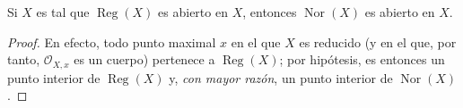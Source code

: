 \begin{corollary}[6.13.5]
\label{IV.2.s6.13.5-fr}
Si $X$ es tal que $\operatorname{Reg}(X)$ es abierto en $X$, entonces
$\operatorname{Nor}(X)$ es abierto en $X$.
\end{corollary}

\begin{proof}
En efecto, todo punto maximal $x$ en el que $X$ es reducido (y en el
que, por tanto, $\mathcal O_{X,x}$ es un cuerpo) pertenece a
$\operatorname{Reg}(X)$; por hipótesis, es entonces un punto interior
de $\operatorname{Reg}(X)$ y, \emph{con mayor razón}, un punto interior de
$\operatorname{Nor}(X)$.
\end{proof}

